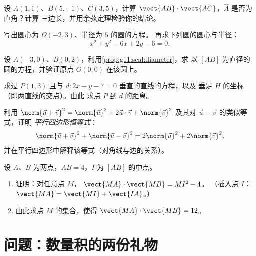 \begin{exercise}[$\star\star$]\label{exo:g11:scal:6}
设 $A(1, 1)$、$B(5, -1)$、$C(3, 5)$，计算
$\vect{AB} \cdot \vect{AC}$，$\widehat A$ 是否为直角？计算
三边长，并用余弦定理检验你的结论。
\end{exercise}

\begin{exercise}[$\star\star$]\label{exo:g11:scal:7}
写出圆心为 $\Omega(-2, 3)$、半径为 $5$ 的圆的方程。
再求下列圆的圆心与半径：
\[
x^2 + y^2 - 6x + 2y - 6 = 0 .
\]
\end{exercise}

\begin{exercise}[$\star\star$]\label{exo:g11:scal:8}
设 $A(-3, 0)$、$B(0, 2)$，利用\cref{prop:g11:scal:diameter}，求
以 $[AB]$ 为直径的圆的方程，并验证原点
$O(0,0)$ 在该圆上。
\end{exercise}

\begin{exercise}[$\star\star$]\label{exo:g11:scal:9}
求过 $P(1, 3)$ 且与
$d : 2x + y - 7 = 0$ 垂直的直线的方程，以及
垂足 $H$ 的坐标（即两直线的交点）。由此
求点 $P$ 到 $d$ 的距离。
\end{exercise}

\begin{exercise}[$\star\star$]\label{exo:g11:scal:10}
利用 $\norm{\vec u + \vec v}^2 = \norm{\vec u}^2 + 2\vec u\cdot\vec v +
\norm{\vec v}^2$ 及其对 $\vec u - \vec v$ 的类似等式，证明
\emph{平行四边形恒等式}：
\[
\norm{\vec u + \vec v}^2 + \norm{\vec u - \vec v}^2
= 2\norm{\vec u}^2 + 2\norm{\vec v}^2 ,
\]
并在平行四边形中解释该等式（对角线与边的关系）。
\end{exercise}

\begin{exercise}[$\star\star\star$]\label{exo:g11:scal:11}
设 $A$、$B$ 为两点，$AB = 4$，$I$ 为
$[AB]$ 的中点。
\begin{enumerate}
  \item 证明：对任意点 $M$，
        $\vect{MA}\cdot\vect{MB} = MI^2 - 4$。
        （插入点 $I$：$\vect{MA} = \vect{MI} + \vect{IA}$。）
  \item 由此求点 $M$ 的集合，使得
        $\vect{MA}\cdot\vect{MB} = 12$。
\end{enumerate}
\end{exercise}

\section{问题：数量积的两份礼物}

